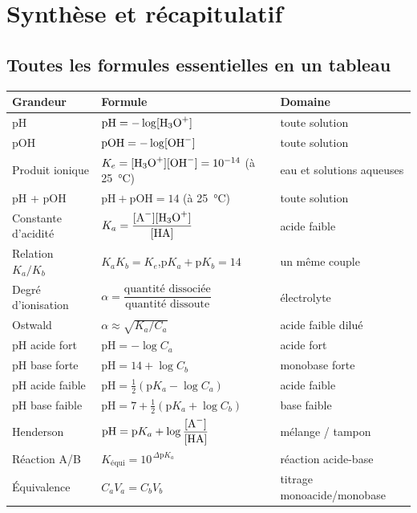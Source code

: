 \documentclass[11pt,a4paper]{article}
\begin{document}
\section{Synthèse et récapitulatif}

\subsection{Toutes les formules essentielles en un tableau}

\begin{center}
\begin{tabular}{lll}
\rowcolor{formulacol!18}
\textbf{Grandeur} & \textbf{Formule} & \textbf{Domaine} \\
\midrule
pH & $\mathrm{pH} = -\log[\ce{H3O+}]$ & toute solution \\
pOH & $\mathrm{pOH} = -\log[\ce{OH-}]$ & toute solution \\
Produit ionique & $K_e = [\ce{H3O+}][\ce{OH-}] = 10^{-14}$ (à \SI{25}{\celsius}) & eau et solutions aqueuses \\
pH + pOH & $\mathrm{pH}+\mathrm{pOH} = 14$ (à \SI{25}{\celsius}) & toute solution \\
Constante d'acidité & $K_a = \dfrac{[\ce{A-}][\ce{H3O+}]}{[\ce{HA}]}$ & acide faible \\
Relation $K_a/K_b$ & $K_a K_b = K_e$,\quad $\mathrm{p}K_a+\mathrm{p}K_b = 14$ & un même couple \\
Degré d'ionisation & $\alpha = \dfrac{\text{quantité dissociée}}{\text{quantité dissoute}}$ & électrolyte \\
Ostwald & $\alpha \approx \sqrt{K_a/C_a}$ & acide faible dilué \\
pH acide fort & $\mathrm{pH} = -\log C_a$ & acide fort \\
pH base forte & $\mathrm{pH} = 14 + \log C_b$ & monobase forte \\
pH acide faible & $\mathrm{pH} = \tfrac12(\mathrm{p}K_a - \log C_a)$ & acide faible \\
pH base faible & $\mathrm{pH} = 7 + \tfrac12(\mathrm{p}K_a + \log C_b)$ & base faible \\
Henderson & $\mathrm{pH} = \mathrm{p}K_a + \log\dfrac{[\ce{A-}]}{[\ce{HA}]}$ & mélange / tampon \\
Réaction A/B & $K_{\text{équi}} = 10^{\,\Delta\mathrm{p}K_a}$ & réaction acide-base \\
Équivalence & $C_a V_a = C_b V_b$ & titrage monoacide/monobase \\
\bottomrule
\end{tabular}
\end{center}
\end{document}
